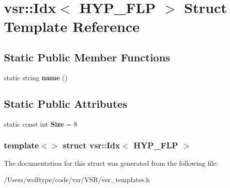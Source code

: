 \hypertarget{structvsr_1_1_idx_3_01_h_y_p___f_l_p_01_4}{\section{vsr\-:\-:Idx$<$ H\-Y\-P\-\_\-\-F\-L\-P $>$ Struct Template Reference}
\label{structvsr_1_1_idx_3_01_h_y_p___f_l_p_01_4}
}
\subsection*{Static Public Member Functions}
\begin{DoxyCompactItemize}
\item 
\hypertarget{structvsr_1_1_idx_3_01_h_y_p___f_l_p_01_4_a0719d5574a7dda9b8cc3a815b6fe805f}{static string {\bfseries name} ()}\label{structvsr_1_1_idx_3_01_h_y_p___f_l_p_01_4_a0719d5574a7dda9b8cc3a815b6fe805f}

\end{DoxyCompactItemize}
\subsection*{Static Public Attributes}
\begin{DoxyCompactItemize}
\item 
\hypertarget{structvsr_1_1_idx_3_01_h_y_p___f_l_p_01_4_ae3cac90b97185dc6eb207eebac9a7789}{static const int {\bfseries Size} = 8}\label{structvsr_1_1_idx_3_01_h_y_p___f_l_p_01_4_ae3cac90b97185dc6eb207eebac9a7789}

\end{DoxyCompactItemize}
\subsubsection*{template$<$$>$ struct vsr\-::\-Idx$<$ H\-Y\-P\-\_\-\-F\-L\-P $>$}



The documentation for this struct was generated from the following file\-:\begin{DoxyCompactItemize}
\item 
/\-Users/wolftype/code/vsr/\-V\-S\-R/vsr\-\_\-templates.\-h\end{DoxyCompactItemize}
